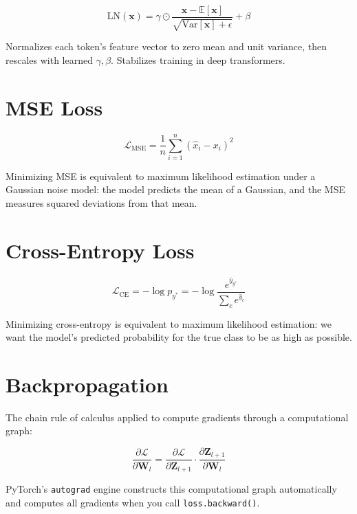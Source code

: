\documentclass[12pt, a4paper]{report}
\newcommand{\mat}[1]{\mathbf{#1}}
\newcommand{\vect}[1]{\bm{#1}}
\begin{document}
\begin{equation}
\text{LN}(\vect{x}) = \gamma \odot \frac{\vect{x} - \mathbb{E}[\vect{x}]}{\sqrt{\text{Var}[\vect{x}] + \epsilon}} + \beta
\end{equation}

Normalizes each token's feature vector to zero mean and unit variance, then rescales with learned $\gamma, \beta$. Stabilizes training in deep transformers.

\section{MSE Loss}

\begin{equation}
\mathcal{L}_{\text{MSE}} = \frac{1}{n}\sum_{i=1}^{n}(\hat{x}_i - x_i)^2
\end{equation}

Minimizing MSE is equivalent to maximum likelihood estimation under a Gaussian noise model: the model predicts the mean of a Gaussian, and the MSE measures squared deviations from that mean.

\section{Cross-Entropy Loss}

\begin{equation}
\mathcal{L}_{\text{CE}} = -\log p_{y^*} = -\log \frac{e^{\hat{y}_{y^*}}}{\sum_c e^{\hat{y}_c}}
\end{equation}

Minimizing cross-entropy is equivalent to maximum likelihood estimation: we want the model's predicted probability for the true class to be as high as possible.

\section{Backpropagation}

The chain rule of calculus applied to compute gradients through a computational graph:

\begin{equation}
\frac{\partial \mathcal{L}}{\partial \mat{W}_l} = \frac{\partial \mathcal{L}}{\partial \mat{Z}_{l+1}} \cdot \frac{\partial \mat{Z}_{l+1}}{\partial \mat{W}_l}
\end{equation}

PyTorch's \texttt{autograd} engine constructs this computational graph automatically and computes all gradients when you call \texttt{loss.backward()}.
\end{document}
